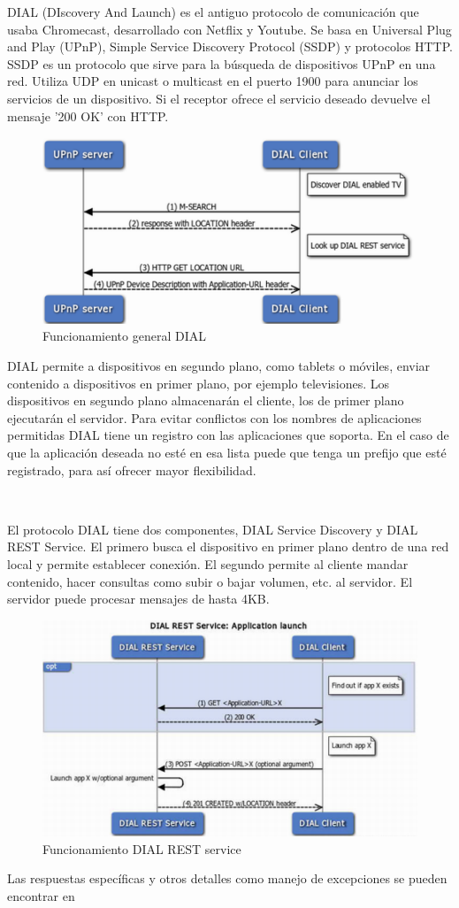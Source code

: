 DIAL (DIscovery And Launch) es el antiguo protocolo de comunicación que usaba Chromecast, desarrollado con Netflix y Youtube.
Se basa en Universal Plug and Play (UPnP), Simple Service Discovery Protocol (SSDP) y protocolos HTTP.
SSDP es un protocolo que sirve para la búsqueda de dispositivos UPnP en una red. Utiliza UDP en unicast o multicast en el puerto 1900 para anunciar los servicios de un dispositivo. Si el receptor ofrece el servicio deseado devuelve el mensaje '200 OK' con HTTP.


\begin{figure}[H]
	\centering
	\includegraphics[scale=0.35]{./Imagenes/dial.png}
	\caption{Funcionamiento general DIAL}
	\label{fig:DIAL}
\end{figure}


DIAL permite a dispositivos en segundo plano, como tablets o móviles, enviar contenido a dispositivos en primer plano, por ejemplo televisiones.
Los dispositivos en segundo plano almacenarán el cliente, los de primer plano ejecutarán el servidor.
Para evitar conflictos con los nombres de aplicaciones permitidas DIAL tiene un registro con las aplicaciones que soporta. En el caso de que la aplicación deseada no esté en esa lista puede que tenga un prefijo que esté registrado, para así ofrecer mayor flexibilidad.

\

El protocolo DIAL tiene dos componentes, DIAL Service Discovery y DIAL REST Service.
El primero busca el dispositivo en primer plano dentro de una red local y permite establecer conexión.
El segundo permite al cliente mandar contenido, hacer consultas como subir o bajar volumen, etc. al servidor.
El servidor puede procesar mensajes de hasta 4KB.

\begin{figure}[H]
	\centering
	\includegraphics[scale=0.45]{./Imagenes/dialrest.png}
	\caption{Funcionamiento DIAL REST service}
	\label{fig:DIAL}
\end{figure}


Las respuestas específicas y otros detalles como manejo de excepciones se pueden encontrar en \cite{dial}
